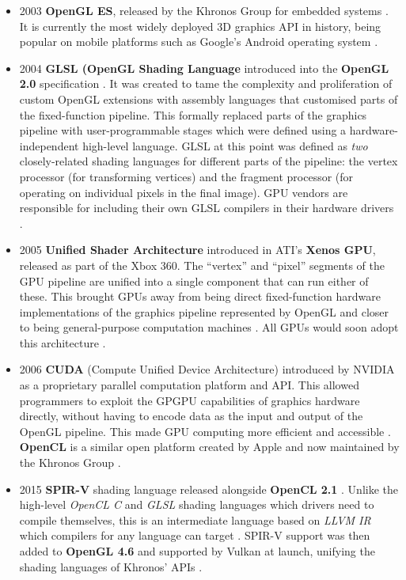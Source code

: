 \documentclass[a4paper,12pt,twoside,openright]{report}
\begin{document}
\begin{itemize}
    \item 2003 \textbf{OpenGL ES}, released by the Khronos Group for embedded
    systems \cite{OpenGLESRelease}. It is currently the most widely deployed 3D
    graphics API in history, being popular on mobile platforms such as Google's
    Android operating system \cite{OpenGLES}.

    \item 2004 \textbf{GLSL (OpenGL Shading Language} introduced into the
    \textbf{OpenGL 2.0} specification \cite{GLSL_1_10}. It was created to tame
    the complexity and proliferation of custom OpenGL extensions with assembly
    languages that customised parts of the fixed-function pipeline. This
    formally replaced parts of the graphics pipeline with user-programmable
    stages which were defined using a hardware-independent high-level language.
    GLSL at this point was defined as \textit{two} closely-related shading
    languages for different parts of the pipeline: the vertex processor (for
    transforming vertices) and the fragment processor (for operating on
    individual pixels in the final image). GPU vendors are responsible for
    including their own GLSL compilers in their hardware drivers \cite{TODO}.

    \item 2005 \textbf{Unified Shader Architecture} introduced in ATI's
    \textbf{Xenos GPU}, released as part of the Xbox 360. The ``vertex'' and
    ``pixel'' segments of the GPU pipeline are unified into a single component
    that can run either of these. This brought GPUs away from being direct
    fixed-function hardware implementations of the graphics pipeline
    represented by OpenGL and closer to being general-purpose computation
    machines \cite{XenosDemystified}. All GPUs would soon adopt this
    architecture \cite{HistoryOfTheGPU}.

    \item 2006 \textbf{CUDA} (Compute Unified Device Architecture) introduced
    by NVIDIA as a proprietary parallel computation platform and API. This
    allowed programmers to exploit the GPGPU capabilities of graphics hardware
    directly, without having to encode data as the input and output of the
    OpenGL pipeline. This made GPU computing more efficient and accessible
    \cite{AboutCUDA}. \textbf{OpenCL} is a similar open platform created by
    Apple and now maintained by the Khronos Group \cite{OpenCL}.

    \item 2015 \textbf{SPIR-V} shading language released alongside
    \textbf{OpenCL 2.1} \cite{SPIRVLaunch}. Unlike the high-level
    \textit{OpenCL C} and \textit{GLSL} shading languages which drivers need to
    compile themselves, this is an intermediate language based on \textit{LLVM
    IR} which compilers for any language can target \cite{LLVMIR} \cite{SPIRV}.
    SPIR-V support was then added to \textbf{OpenGL 4.6} and supported by
    Vulkan at launch, unifying the shading languages of Khronos' APIs
    \cite{SPIRVOpenGL}.


\end{itemize}
\end{document}
